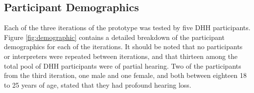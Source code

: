 \documentclass{sigchi-ext}
\begin{document}
\subsection{Participant Demographics}






Each of the three iterations of the prototype was tested by five DHH participants. Figure \ref{fig:demographic} contains a detailed breakdown of the participant demographics for each of the iterations. It should be noted that no participants or interpreters were repeated between iterations, and that thirteen among the total pool of DHH participants were of partial hearing. Two of the participants from the third iteration, one male and one female, and both between eighteen 18 to 25 years of age, stated that they had profound hearing loss.
\end{document}
